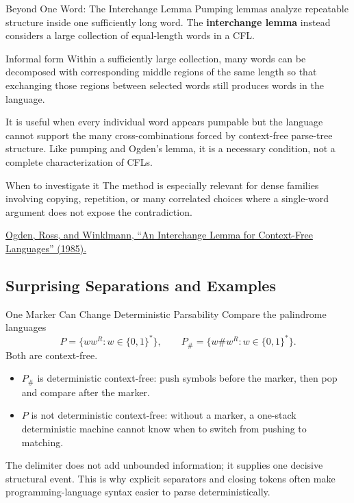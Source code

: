 \documentclass[10pt]{beamer}
\newcommand{\paperlink}[2]{%
  \href{#1}{\textcolor{blue!65!black}{#2}}%
}
\begin{document}
\begin{frame}{Beyond One Word: The Interchange Lemma}
  \small
  Pumping lemmas analyze repeatable structure inside one sufficiently long
  word. The \textbf{interchange lemma} instead considers a large collection
  of equal-length words in a CFL.
  \pause
  \begin{block}{Informal form}
    Within a sufficiently large collection, many words can be decomposed with
    corresponding middle regions of the same length so that exchanging those
    regions between selected words still produces words in the language.
  \end{block}
  \pause
  It is useful when every individual word appears pumpable but the language
  cannot support the many cross-combinations forced by context-free parse-tree
  structure. Like pumping and Ogden's lemma, it is a necessary condition, not
  a complete characterization of CFLs.
  \begin{exampleblock}{When to investigate it}
    The method is especially relevant for dense families involving copying,
    repetition, or many correlated choices where a single-word argument does
    not expose the contradiction.
  \end{exampleblock}

  \paperlink{https://doi.org/10.1137/0214031}{Ogden, Ross, and Winklmann,
  ``An Interchange Lemma for Context-Free Languages'' (1985).}
\end{frame}

\subsection{Surprising Separations and Examples}

\begin{frame}{One Marker Can Change Deterministic Parsability}
  \small
  Compare the palindrome languages
  \[
    P=\{ww^R:w\in\{0,1\}^*\},
    \qquad
    P_\#=\{w\#w^R:w\in\{0,1\}^*\}.
  \]
  Both are context-free.
  \pause
  \begin{itemize}
    \item $P_\#$ is deterministic context-free: push symbols before the
      marker, then pop and compare after the marker.
    \item $P$ is not deterministic context-free: without a marker, a
      one-stack deterministic machine cannot know when to switch from pushing
      to matching.
  \end{itemize}
  \pause

  The delimiter does not add unbounded information; it supplies one decisive
  structural event. This is why explicit separators and closing tokens often
  make programming-language syntax easier to parse deterministically.
\end{frame}
\end{document}
